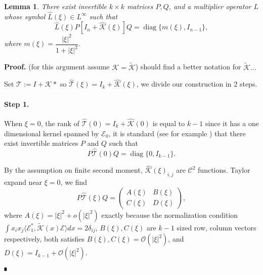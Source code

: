 \documentclass[letterpaper,11pt]{article}
\newcommand{\R}{\mathbb{R}}
\newcommand{\rmO}{\mathcal{O}}
\newcommand{\K}{\mathcal{K}}
\newcommand{\That}{\widehat{\mathcal{T}}}
\newcommand{\diag}{\operatorname{diag}}
\numberwithin{equation}{section}
\theoremstyle{plain}
\newtheorem{lemma}[theorem]{Lemma}
\theoremstyle{remark}
\newenvironment{Proof}[1][.]%
 {\begin{trivlist}\item[]\textbf{Proof#1 }}%
 {\hspace*{\fill}$\rule{0.3\baselineskip}{0.35\baselineskip}$\end{trivlist}}
\begin{document}
\begin{lemma}\label{Lem1} There exist invertible $k \times k$ matrices $P, Q$, and a multiplier operator $L$ whose symbol $\widehat{L}(\xi) \in L^\infty$ such that
\[
\widehat{L}(\xi)P[I_n+\widehat{\K}(\xi)]Q = \diag\{m(\xi),I_{n-1} \},
\]
where $m(\xi) = \dfrac{|\xi|^2}{1+|\xi|^2}$.

\end{lemma}
\begin{Proof}
(for this argument assume $\K = \tilde{\K}$) should find a better notation for $\tilde{\K}...$

Set $\mathcal{T} := I + \K \ast$ so $\widehat{\mathcal{T}}(\xi) = I_k+\widehat{\K}(\xi)$, we divide our construction in 2 steps.

\paragraph{Step 1.}
 When $\xi = 0$, the rank of $\widehat{\mathcal{T}}(0)=I_k+\widehat{\K}(0)$ is equal to $k-1$ since it has a one dimensional kernel spanned by $\mathcal{E}_0$, it is standard (see for example \cite{roman2007advanced}) that there exist invertible matrices $P$ and $Q$ such that
\[
P\That(0)Q = \diag\{0,I_{k-1}\}.
\]



By the assumption on finite second moment, $\widehat{\K}(\xi)_{i,j}$ are $\mathscr{C}^2$ functions. Taylor expand near $\xi = 0$, we find
\[
P\That(\xi)Q = \begin{pmatrix}
A(\xi)& B(\xi)\\
C(\xi)& D(\xi) 
\end{pmatrix},
\]
where $A(\xi) = |\xi|^2+o(|\xi|^2)$ exactly because the normalization condition $\int x_ix_j\langle \mathcal{E}_1^*, \tilde{\K}(x)\mathcal{E}\rangle dx = 2\delta_{ij}$, $B(\xi), C(\xi)$ are $k-1$ sized row, column vectors respectively, both satisfies $B(\xi),C(\xi) =\rmO(|\xi|^2)$, and $D(\xi) =I_{k-1}+\rmO(|\xi|^2)$. 



\end{Proof}
\end{document}
